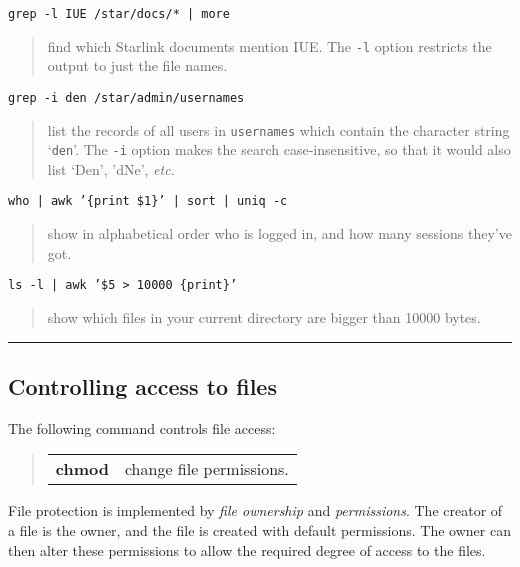 \documentclass[twoside,11pt]{article}
\newcommand{\example}[2]{\goodbreak
                         {\tt #1}
                         \vspace*{-4mm}
                         \begin{quote}
                           {\small #2}
                         \end{quote}
                        }
\newcommand{\example}[2]{\goodbreak
                            {\tt #1}
                            \vspace*{-4mm}
                            \begin{quote}
                            {#2}
                            \end{quote}
                           }
\newcommand{\exend}{\begin{center}
                    \rule{50mm}{0.3mm}
                    \end{center}
                   }
\begin{document}
\example{grep -l IUE /star/docs/* | more }
{find which Starlink documents mention IUE.
The {\tt -l} option restricts the output to just the file names.}

\example{grep -i den /star/admin/usernames}
{list the records of all users in {\tt usernames} which contain the character
string `{\tt den}'.
The {\tt -i} option makes the search case-insensitive, so that it would also
list `Den', 'dNe', {\em etc.}}

\example{who | awk {\tt '\{print \$1}\}' | sort | uniq -c}
{show in alphabetical order who is logged in, and how many sessions they've
got.}

\example{ls -l | awk '\$5 > 10000 \{print\}'}
{show which files in your current directory are bigger than 10000 bytes.}

\exend

\subsection{Controlling access to files}

The following command controls file access:

\begin{quote}
\begin{tabular}{lp{72mm}}

{\bf chmod}  & change file permissions.

\end{tabular}
\end{quote}


File protection is implemented by {\em file ownership}\/ and {\em permissions}.
The creator of a file is the owner, and the file is created with default
permissions.
The owner can then alter these permissions to allow the required degree of
access to the files.
\end{document}
